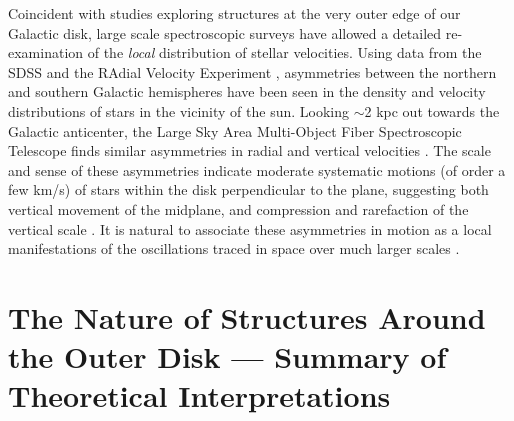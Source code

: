 \documentclass[galaxies,article,submit,moreauthors,pdftex,10pt,a4paper]{mdpi}
\begin{document}
Coincident with studies exploring structures at the very outer edge of our
Galactic disk, large scale spectroscopic surveys have allowed a detailed
re-examination of the {\it local} distribution of stellar velocities.
Using data from the SDSS \cite{widrow12,yanny13} and the RAdial Velocity
Experiment \cite[RAVE;][]{rave,williams13}, asymmetries between the northern and
southern Galactic hemispheres have been seen in the density and velocity
distributions of stars in the vicinity of the sun.
Looking $\sim$2 kpc out towards the Galactic anticenter, the Large Sky Area Multi-Object Fiber Spectroscopic Telescope \cite[LAMOST;][]{cui12,deng12,zhao12} finds similar asymmetries in radial and vertical velocities \cite{carlin13}.
The scale and sense of these asymmetries indicate moderate systematic motions (of order a few km/s) of stars within the disk perpendicular to the plane, suggesting both vertical movement of the midplane, and compression and rarefaction of the vertical scale \cite[referred to as ``bending'' and ``breathing'' modes respectively --- see, e.g.,][]{widrow14}.
It is natural to associate these asymmetries in motion as a local manifestations of the oscillations traced in space over much larger scales \cite{xu15,pricewhelan15}.


\section{The Nature of Structures Around the Outer Disk --- Summary of Theoretical Interpretations}
\label{sec:theory}
\end{document}
